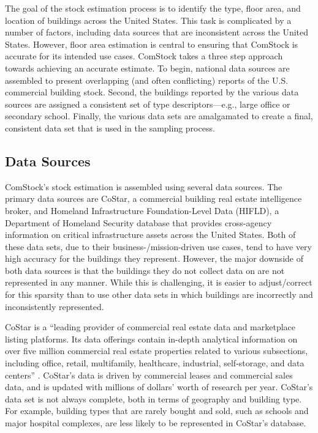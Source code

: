 The goal of the stock estimation process is to identify the type, floor area, and location of buildings across the United States. This task is complicated by a number of factors, including data sources that are inconsistent across the United States. However, floor area estimation is central to ensuring that ComStock is accurate for its intended use cases. ComStock takes a three step approach towards achieving an accurate estimate. To begin, national data sources are assembled to present overlapping (and often conflicting) reports of the U.S. commercial building stock. Second, the buildings reported by the various data sources are assigned a consistent set of type descriptors---e.g., large office or secondary school. Finally, the various data sets are amalgamated to create a final, consistent data set that is used in the sampling process.

\subsection{Data Sources}

ComStock's stock estimation is assembled using several data sources. The primary data sources are CoStar, a commercial building real estate intelligence broker, and Homeland Infrastructure Foundation-Level Data (HIFLD), a Department of Homeland Security database that provides cross-agency information on critical infrastructure assets across the United States. Both of these data sets, due to their business-/mission-driven use cases, tend to have very high accuracy for the buildings they represent. However, the major downside of both data sources is that the buildings they do not collect data on are not represented in any manner. While this is challenging, it is easier to adjust/correct for this sparsity than to use other data sets in which buildings are incorrectly and inconsistently represented.

CoStar is a ``leading provider of commercial real estate data and marketplace listing platforms. Its data offerings contain in-depth analytical information on over five million commercial real estate properties related to various subsections, including office, retail, multifamily, healthcare, industrial, self-storage, and data centers'' \citep{costar_10k}. CoStar's data is driven by commercial leases and commercial sales data, and is updated with millions of dollars' worth of research per year. CoStar's data set is not always complete, both in terms of geography and building type. For example, building types that are rarely bought and sold, such as schools and major hospital complexes, are less likely to be represented in CoStar's database.

